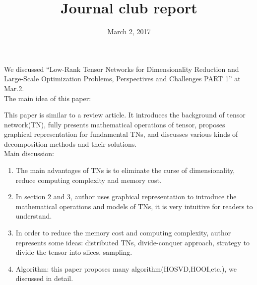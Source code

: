 \documentclass[UTF8]{article}
\begin{document}
	\title{Journal club report}	
	\date{March 2, 2017} 
	\maketitle
    	We discussed “Low-Rank Tensor Networks for Dimensionality Reduction and Large-Scale Optimization Problems, Perspectives and Challenges PART 1” at Mar.2.\\
    	The main idea of this paper:
    	
    	This paper is similar to a review article. It introduces the background of tensor network(TN), fully presents mathematical operations of tensor, proposes graphical representation for fundamental TNs, and discusses various kinds of decomposition methods and their solutions.\\
    	Main discussion:
    	\begin{enumerate}[1)]
    		\item The main advantages of TNs is to eliminate the curse of dimensionality, reduce computing complexity and memory cost.
    		\item In section 2 and 3, author uses graphical representation to introduce the mathematical operations and models of TNs, it is very intuitive for readers to understand.
    		\item In order to reduce the memory cost and computing complexity, author represents some ideas: distributed TNs, divide-conquer approach, strategy to divide the tensor into slices, sampling.
    		\item Algorithm: this paper proposes many algorithm(HOSVD,HOOI,etc.), we discussed in detail. 
    	\end{enumerate}
    
   	
    		
\end{document}
